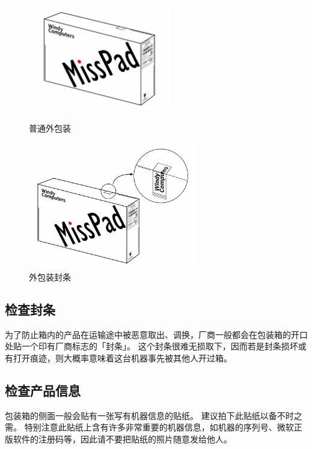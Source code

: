 \begin{figure}[htb!]
  \centering
  \begin{minipage}{6.2cm}
    \centering
    \includegraphics[width=6.2cm]{assets/Pack.jpg}
    \caption{普通外包装}
    \label{pack}
  \end{minipage}
  \begin{minipage}{7.3cm}
    \centering
    \includegraphics[width=7.3cm]{assets/Seal.jpg}
    \caption{外包装封条}
    \label{seal}
  \end{minipage}
\end{figure}

\subsection{检查封条}

为了防止箱内的产品在运输途中被恶意取出、调换，厂商一般都会在包装箱的开口处贴一个印有厂商标志的「封条」。
这个封条很难无损取下，因而若是封条损坏或有打开痕迹，则大概率意味着这台机器事先被其他人开过箱。

\subsection{检查产品信息}

包装箱的侧面一般会贴有一张写有机器信息的贴纸。
建议拍下此贴纸以备不时之需。
特别注意此贴纸上含有许多非常重要的机器信息，如机器的序列号、微软正版软件的注册码等，因此请不要把贴纸的照片随意发给他人。

